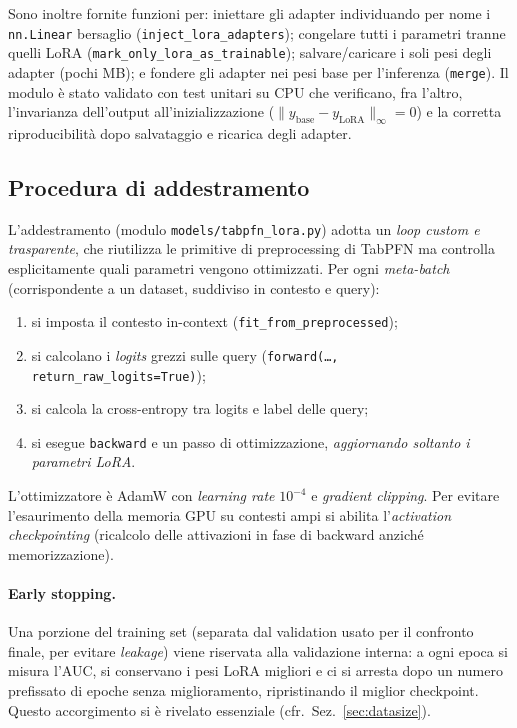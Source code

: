 \documentclass[11pt,a4paper]{article}
\begin{document}
Sono inoltre fornite funzioni per: iniettare gli adapter individuando per nome i
\texttt{nn.Linear} bersaglio (\texttt{inject\_lora\_adapters}); congelare tutti i
parametri tranne quelli LoRA (\texttt{mark\_only\_lora\_as\_trainable});
salvare/caricare i soli pesi degli adapter (pochi MB); e fondere gli adapter nei
pesi base per l'inferenza (\texttt{merge}). Il modulo è stato validato con test
unitari su CPU che verificano, fra l'altro, l'invarianza dell'output
all'inizializzazione ($\lVert y_{\text{base}}-y_{\text{LoRA}}\rVert_\infty = 0$)
e la corretta riproducibilità dopo salvataggio e ricarica degli adapter.

\subsection{Procedura di addestramento}
L'addestramento (modulo \texttt{models/tabpfn\_lora.py}) adotta un \emph{loop
custom e trasparente}, che riutilizza le primitive di preprocessing di TabPFN ma
controlla esplicitamente quali parametri vengono ottimizzati. Per ogni
\emph{meta-batch} (corrispondente a un dataset, suddiviso in contesto e query):
\begin{enumerate}[nosep]
  \item si imposta il contesto in-context (\texttt{fit\_from\_preprocessed});
  \item si calcolano i \emph{logits} grezzi sulle query
  (\texttt{forward(\dots, return\_raw\_logits=True)});
  \item si calcola la cross-entropy tra logits e label delle query;
  \item si esegue \texttt{backward} e un passo di ottimizzazione,
  \emph{aggiornando soltanto i parametri LoRA}.
\end{enumerate}
L'ottimizzatore è AdamW con \emph{learning rate} $10^{-4}$ e \emph{gradient
clipping}. Per evitare l'esaurimento della memoria GPU su contesti ampi si
abilita l'\emph{activation checkpointing} (ricalcolo delle attivazioni in fase di
backward anziché memorizzazione).

\paragraph{Early stopping.} Una porzione del training set (separata dal
validation usato per il confronto finale, per evitare \emph{leakage}) viene
riservata alla validazione interna: a ogni epoca si misura l'AUC, si conservano i
pesi LoRA migliori e ci si arresta dopo un numero prefissato di epoche senza
miglioramento, ripristinando il miglior checkpoint. Questo accorgimento si è
rivelato essenziale (cfr.\ Sez.~\ref{sec:datasize}).
\end{document}
